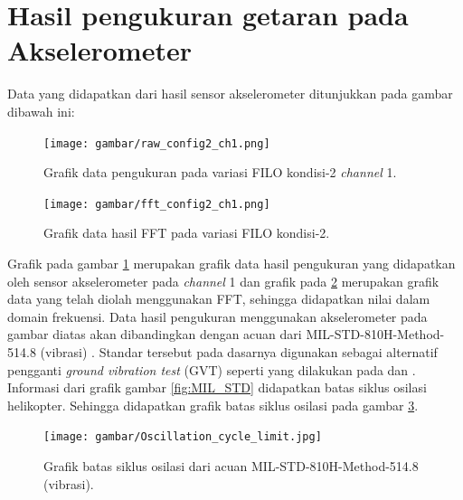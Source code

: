 \section{Hasil pengukuran getaran pada Akselerometer}

Data yang didapatkan dari hasil sensor akselerometer ditunjukkan pada gambar dibawah ini:

\begin{figure}[h]
	\centering
	\texttt{[image: gambar/raw\_config2\_ch1.png]}
	\caption{Grafik data pengukuran pada variasi FILO kondisi-2 \textit{channel} 1.}
	\label{fig:raw_config2_FILO}
\end{figure}

\begin{figure}[H]
	\centering
	\texttt{[image: gambar/fft\_config2\_ch1.png]}
	\caption{Grafik data hasil FFT pada variasi FILO kondisi-2.}
	\label{fig:fft_config2_FILO}
\end{figure}

Grafik pada gambar \ref{fig:raw_config2_FILO} merupakan grafik data hasil pengukuran yang didapatkan oleh sensor akselerometer pada \textit{channel} 1 dan grafik pada \ref{fig:fft_config2_FILO} merupakan grafik data yang telah diolah menggunakan FFT, sehingga didapatkan nilai dalam domain frekuensi. Data hasil pengukuran menggunakan akselerometer pada gambar diatas akan dibandingkan dengan acuan dari MIL-STD-810H-Method-514.8 (vibrasi) \cite{MILSTD}. Standar tersebut pada dasarnya digunakan sebagai alternatif pengganti \textit{ground vibration test} (GVT) seperti yang dilakukan pada \cite{lubrina:hal-01059708} dan \cite{Ciavarella2018AnEH}. Informasi dari grafik gambar \ref{fig:MIL_STD} didapatkan batas siklus osilasi helikopter. Sehingga didapatkan grafik batas siklus osilasi pada gambar \ref{fig:batas_siklus}. 

\begin{figure}[h]
	\centering
	\texttt{[image: gambar/Oscillation\_cycle\_limit.jpg]}
	\caption{Grafik batas siklus osilasi dari acuan MIL-STD-810H-Method-514.8 (vibrasi).}
	\label{fig:batas_siklus}
\end{figure}

